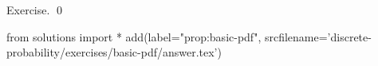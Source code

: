
\begin{prop}
  \label{prop:basic-pdf}
  
\end{prop}
\proof
Exercise.
\qed
\begin{python0}
from solutions import *
add(label="prop:basic-pdf",
    srcfilename='discrete-probability/exercises/basic-pdf/answer.tex') 
\end{python0}
